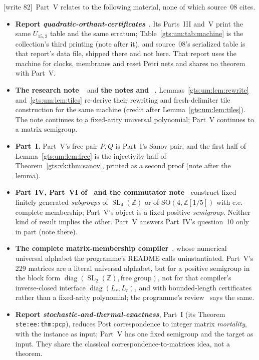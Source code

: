 \documentclass[11pt,letterpaper]{article}
\theoremstyle{definition}
\theoremstyle{remark}
\newcommand{\Z}{\mathbb Z}
\newcommand{\SL}{\operatorname{SL}}
\newcommand{\diag}{\operatorname{diag}}
\newcommand{\wtagc}{\textup{[write 82]}}
\begin{document}
\wtagc\ Part~V relates to the following material, none of which source~08 cites.
\begin{itemize}
\item \textbf{Report \emph{quadratic-orthant-certificates}}~\cite{qoc}. Its Parts~III and~V print the same $U_{15,2}$ table and the same erratum; Table~\ref{gts:um:tab:machine} is the collection's third printing (note after it), and source~08's serialized table is that report's data file, shipped there and not here. That report uses the machine for clocks, membranes and reset Petri nets and shares no theorem with Part~V.
\item \textbf{The research note }~\cite{repo-nw15} and \textbf{the notes  and }~\cite{repo-gpcp}. Lemmas~\ref{gts:um:lem:rewrite} and~\ref{gts:um:lem:tiles} re-derive their rewriting and fresh-delimiter tile construction for the same machine (credit after Lemma~\ref{gts:um:lem:tiles}). The note continues to a fixed-arity universal polynomial; Part~V continues to a matrix semigroup.
\item \textbf{Part~I.} Part~V's free pair $P,Q$ is Part~I's Sanov pair, and the first half of Lemma~\ref{gts:um:lem:free} is the injectivity half of Theorem~\ref{gts:vk:thm:sanov}, printed as a second proof (note after the lemma).
\item \textbf{Part~IV, Part~VI of~\cite{pqc} and the commutator note~\cite{repo-comm}} construct fixed finitely generated \emph{subgroups} of $\SL_4(\Z)$ or of $\mathrm{SO}(4,\Z[1/5])$ with c.e.-complete membership; Part~V's object is a fixed positive \emph{semigroup}. Neither kind of result implies the other. Part~V answers Part~IV's question~10 only in part (note there).
\item \textbf{The complete matrix-membership compiler}~\cite{repo-cmc}, whose numerical universal alphabet the programme's README calls uninstantiated. Part~V's 229 matrices are a literal universal alphabet, but for a positive semigroup in the block form $\diag(\SL_2(\Z),\text{free group})$, not for that compiler's inverse-closed interface $\diag(L_r,L_r)$, and with bounded-length certificates rather than a fixed-arity polynomial; the programme's review~\cite{repo-revmg} says the same.
\item \textbf{Report \emph{stochastic-and-thermal-exactness}}, Part~I (its Theorem \texttt{ste:ee:thm:pcp}), reduces Post correspondence to integer matrix \emph{mortality}, with the instance as input; Part~V has one fixed semigroup and the target as input. They share the classical correspondence-to-matrices idea, not a theorem.

\end{itemize}
\end{document}
